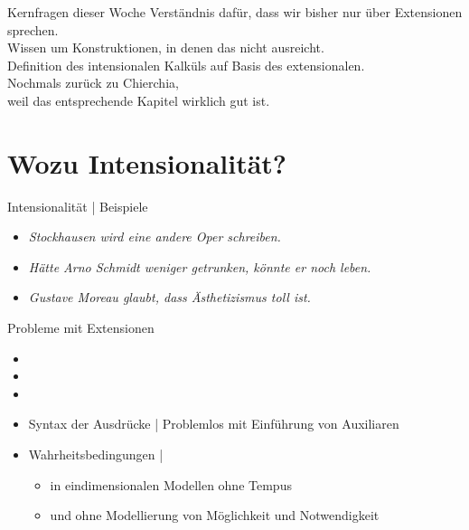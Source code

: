 \begin{frame}
  {Kernfragen dieser Woche}
  \onslide<+->
  \onslide<+->
  \Large
  \centering 
  Verständnis dafür, dass wir bisher nur über \alert{Extensionen} sprechen.\\
  \Halbzeile
  \onslide<+->
  Wissen um Konstruktionen, in denen das nicht ausreicht.\\
  \Halbzeile
  \onslide<+->
  Definition des intensionalen Kalküls auf Basis des extensionalen.\\
  \Halbzeile
  \onslide<+->
  Nochmals zurück zu Chierchia,\\
  weil das entsprechende Kapitel wirklich gut ist.\\
  \onslide<+->
  \Halbzeile
\end{frame}

\section{Wozu Intensionalität?}

\begin{frame}
  {Intensionalität | Beispiele}
  \onslide<+->
  \begin{itemize}[<+->]
    \item \textit{Stockhausen \alert{wird} eine andere Oper schreiben.}
    \item \textit{\alert{Hätte} Arno Schmidt weniger getrunken, \alert{könnte} er noch leben.}
    \item \textit{Gustave Moreau \alert{glaubt}, dass Ästhetizismus toll ist.}
  \end{itemize}
\end{frame}

\begin{frame}
  {Probleme mit Extensionen}
  \onslide<+->
  \onslide<+->
  \begin{itemize}
    \item {}
    \item {}
    \item {}
  \end{itemize}
  \Halbzeile
  \begin{itemize}[<+->]
    \item \alert{Syntax} der Ausdrücke | Problemlos mit Einführung von Auxiliaren
    \item \alert{Wahrheitsbedingungen} | 
      \begin{itemize}[<+->]
        \item in eindimensionalen Modellen ohne Tempus 
        \item und ohne Modellierung von Möglichkeit und Notwendigkeit\\
      \end{itemize}
  \end{itemize}
\end{frame}


